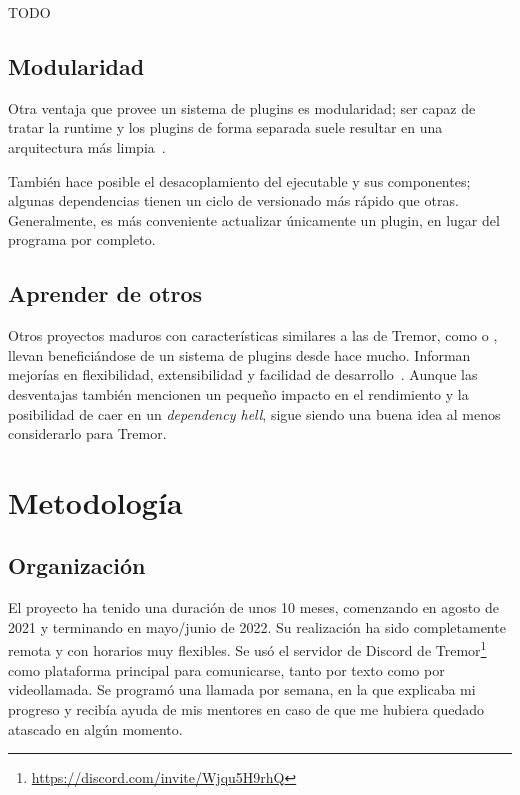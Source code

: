 TODO

\subsection{Modularidad}

Otra ventaja que provee un sistema de plugins es modularidad; ser capaz de
tratar la runtime y los plugins de forma separada suele resultar en una
arquitectura más limpia~\cite{baldwin2000design}.

También hace posible el desacoplamiento del ejecutable y sus componentes;
algunas dependencias tienen un ciclo de versionado más rápido que otras.
Generalmente, es más conveniente actualizar únicamente un plugin, en lugar del
programa por completo.

\subsection{Aprender de otros}

Otros proyectos maduros con características similares a las de Tremor, como
\textcite{nginx} o \textcite{apachehttpserver}, llevan beneficiándose de un
sistema de plugins desde hace mucho. Informan mejorías en flexibilidad,
extensibilidad y facilidad de
desarrollo~\cite{nginxPluginsAdvantages}\cite{apachePluginsAdvantages}. Aunque
las desventajas también mencionen un pequeño impacto en el rendimiento y la
posibilidad de caer en un \emph{dependency hell}, sigue siendo una buena idea al
menos considerarlo para Tremor.

\section{Metodología}

\subsection{Organización}

El proyecto ha tenido una duración de unos 10 meses, comenzando en agosto de
2021 y terminando en mayo/junio de 2022. Su realización ha sido completamente
remota y con horarios muy flexibles. Se usó el servidor de Discord de
Tremor\footnote{\url{https://discord.com/invite/Wjqu5H9rhQ}} como plataforma
principal para comunicarse, tanto por texto como por videollamada. Se programó
una llamada por semana, en la que explicaba mi progreso y recibía ayuda de mis
mentores en caso de que me hubiera quedado atascado en algún momento.

